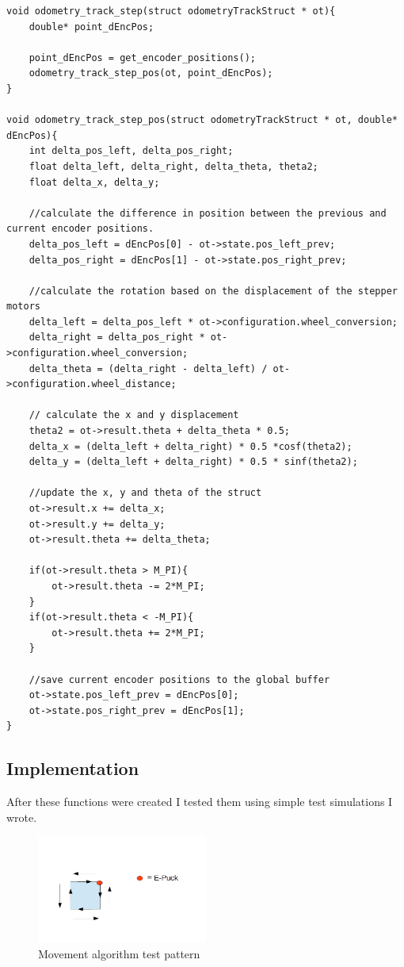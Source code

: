 \begin{lstlisting}
void odometry_track_step(struct odometryTrackStruct * ot){
	double* point_dEncPos;
	
	point_dEncPos = get_encoder_positions();
	odometry_track_step_pos(ot,	point_dEncPos);
}

void odometry_track_step_pos(struct odometryTrackStruct * ot, double* dEncPos){
	int delta_pos_left, delta_pos_right;
	float delta_left, delta_right, delta_theta, theta2;
	float delta_x, delta_y;
	
	//calculate the difference in position between the previous and current encoder positions. 
	delta_pos_left = dEncPos[0] - ot->state.pos_left_prev;
	delta_pos_right = dEncPos[1] - ot->state.pos_right_prev;
	
	//calculate the rotation based on the displacement of the stepper motors 
	delta_left = delta_pos_left * ot->configuration.wheel_conversion;
	delta_right = delta_pos_right * ot->configuration.wheel_conversion;
	delta_theta = (delta_right - delta_left) / ot->configuration.wheel_distance;
	
	// calculate the x and y displacement 
	theta2 = ot->result.theta + delta_theta * 0.5;
	delta_x = (delta_left + delta_right) * 0.5 *cosf(theta2);
	delta_y = (delta_left + delta_right) * 0.5 * sinf(theta2);
	
	//update the x, y and theta of the struct
	ot->result.x += delta_x;
	ot->result.y += delta_y;
	ot->result.theta += delta_theta;
	
	if(ot->result.theta > M_PI){
		ot->result.theta -= 2*M_PI;
	}
	if(ot->result.theta < -M_PI){
		ot->result.theta += 2*M_PI;
	}
	
	//save current encoder positions to the global buffer 
	ot->state.pos_left_prev = dEncPos[0];
	ot->state.pos_right_prev = dEncPos[1];
}
\end{lstlisting}

\subsection{Implementation}
After these functions were created I tested them using simple test simulations I wrote.\\

\begin{figure}[h]
\centering
\includegraphics[width = 0.5\textwidth]{../../figures/movement_test.png} 
\caption{Movement algorithm test pattern}
\label{Figure 4}
\end{figure}

